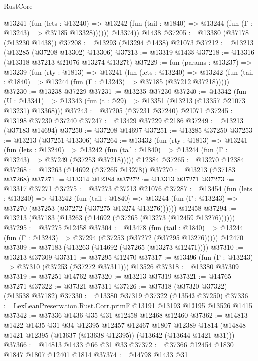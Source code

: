 \begin{lexlean}{RustCore}
\begin{coremodule}
            @13241
              (fun (lets : @13240) =>
              @13242 (fun (tail : @1840) => @13244 (fun (Γ : @13243) => @37185 @13328))))))
        @13374))
    @1438
@37205 := @13380 (@37178 (@13230 @1438))
@37208 := @13293 (@13294 @1438) @21073
@37212 := @13213 (@13285 (@37208 @13302) @13306)
@37213 := @13319 @1438
@37218 := @13316 (@13318 @37213 @21076 @13274 @13276)
@37229 := fun (params : @13237) =>
  @13239
    (fun (rty : @1813) =>
    @13241
      (fun (lets : @13240) =>
      @13242 (fun (tail : @1840) => @13244 (fun (Γ : @13243) => @37185 (@37212 @37218)))))
@37230 := @13238 @37229
@37231 := @13235 @37230
@37240 := @13342
    (fun (U : @13341) => @13343 (fun (t : @29) => @13351 (@13213 (@13357 @21073 @13231) @13368)))
@37243 := @37205 (@37231 @37240) @21071
@37245 := @13198 @37230 @37240
@37247 := @13429 @37229 @2186
@37249 := @13213 (@37183 @14694)
@37250 := @37208 @14697
@37251 := @13285 @37250
@37253 := @13213 (@37251 @13306)
@37264 := @13432
    (fun (rty : @1813) =>
    @13241
      (fun (lets : @13240) =>
      @13242 (fun (tail : @1840) => @13244 (fun (Γ : @13243) => @37249 (@37253 @37218)))))
    @12384
@37265 := @13270 @12384
@37268 := @13263 (@14692 (@37265 @13278))
@37270 := @13213 (@37183 @37268)
@37271 := @13314 @12384
@37272 := @13313 @37271
@37273 := @13317 @37271
@37275 := @37273 @37213 @21076
@37287 := @13454
    (fun (lets : @13240) =>
    @13242
      (fun (tail : @1840) =>
      @13244 (fun (Γ : @13243) => @37270 (@37253 (@37272 (@37275 @13274 @13276))))))
    @12458
@37294 := @13213 (@37183 (@13263 (@14692 (@37265 (@13273 (@12459 @13276))))))
@37295 := @37275 @12458
@37304 := @13478
    (fun (tail : @1840) => @13244 (fun (Γ : @13243) => @37294 (@37253 (@37272 (@37295 @13276)))))
    @12470
@37309 := @37183 (@13263 (@14692 (@37265 (@13273 @12471))))
@37310 := @13213 @37309
@37311 := @37295 @12470
@37317 := @13496 (fun (Γ : @13243) => @37310 (@37253 (@37272 @37311))) @13526
@37318 := @13380 @37309
@37319 := @37251 @14762
@37320 := @13213 @37319
@37321 := @14765 @37271
@37322 := @37321 @37311
@37326 := @37318 (@37320 @37322) (@13538 @37182)
@37330 := @13380 @37319 @37322 (@13543 @37250)
@37336 := LexLeanPreservation.Rust.Corr.primF @13191 @13193 @13195 @13526 @1415
@37342 := @37336 @1436 @35 @31 @12458 @12468 @12460
@37362 := @14813
    @1422
    @1435
    @31
    @34
    @12395
    @12457
    @12467
    @1807
    @12389
    @1814
    (@14848 @1421 @12395 (@13637 (@13638 @12395)) (@13642 (@13644 @1421 @31)))
@37366 := @14813 @1433 @66 @31 @33
@37372 := @37366 @12454 @1830 @1847 @1807 @12401 @1814
@37374 := @14798 @1433 @31

\end{coremodule}
\end{lexlean}
